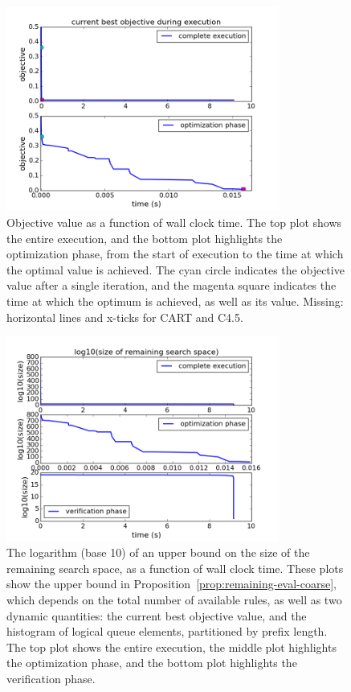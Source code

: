 \begin{figure}[t!]
\begin{center}
\includegraphics[width=0.8\textwidth]{figs/ela-objective.png}
\end{center}
\caption{Objective value as a function of wall clock time.
%
The top plot shows the entire execution, and the bottom plot
highlights the optimization phase, from the start of execution
to the time at which the optimal value is achieved.
%
The cyan circle indicates the objective value after a single iteration,
and the magenta square indicates the time at which the optimum
is achieved, as well as its value.
%
Missing: horizontal lines and x-ticks for CART and C4.5.}
\label{fig:objective}
\end{figure}

\begin{figure}[t!]
\begin{center}
\includegraphics[width=0.8\textwidth]{figs/ela-remaining-space.png}
\end{center}
\caption{The logarithm (base 10) of an upper bound
on the size of the remaining search space,
as a function of wall clock time.
%
These plots show the upper bound in
Proposition~\ref{prop:remaining-eval-coarse},
which depends on the total number of available rules,
as well as two dynamic quantities:
the current best objective value,
and the histogram of logical queue elements,
partitioned by prefix length.
%
The top plot shows the entire execution,
the middle plot highlights the optimization phase,
and the bottom plot highlights the verification phase.}
\label{fig:search-space}
\end{figure}

